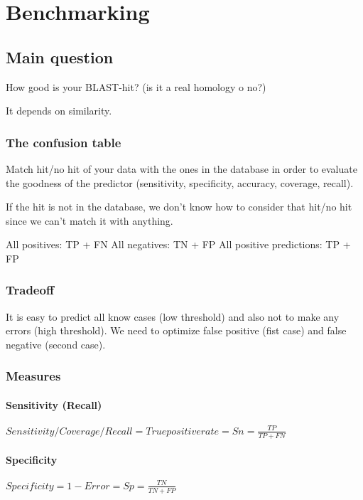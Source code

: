 \chapter{Benchmarking}

\section{Main question}

How good is your BLAST-hit? (is it a real homology o no?)

It depends on similarity.

\subsection{The confusion table}

Match hit/no hit of your data with the ones in the database in order to evaluate
the goodness of the predictor (sensitivity, specificity, accuracy, coverage,
recall).

If the hit is not in the database, we don't know how to consider that hit/no hit
since we can't match it with anything.

All positives: TP + FN
All negatives: TN + FP
All positive predictions: TP + FP

\subsection{Tradeoff}

It is easy to predict all know cases (low threshold) and also not to make any
errors (high threshold). We need to optimize false positive (fist case) and
false negative (second case).

\subsection{Measures}

\subsubsection{Sensitivity (Recall)}

$Sensitivity/Coverage/Recall = True positive rate = Sn = \frac{TP}{TP + FN}$

\subsubsection{Specificity}

$Specificity = 1 - Error = Sp = \frac{TN}{TN + FP}$

